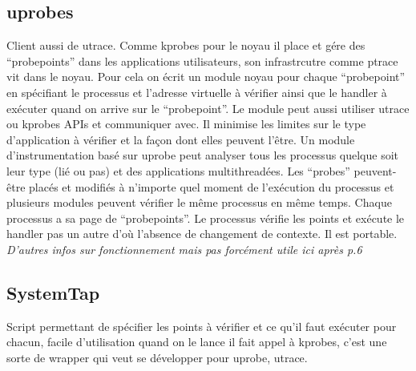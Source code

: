 \documentclass{article}
\begin{document}
\subsection{uprobes}
Client aussi de utrace. Comme kprobes pour le noyau il place et gére
des ``probepoints'' dans les applications utilisateurs, son
infrastrcutre comme ptrace vit dans le noyau. Pour cela on écrit un
module noyau pour chaque ``probepoint'' en spécifiant le processus et
l'adresse virtuelle à vérifier ainsi que le handler à exécuter quand
on arrive sur le ``probepoint''. Le module peut aussi utiliser utrace
ou kprobes APIs et communiquer avec. Il minimise les limites sur le
type d'application à vérifier et la façon dont elles peuvent
l'être. Un module d'instrumentation basé sur uprobe peut analyser tous
les processus quelque soit leur type (lié ou pas) et des applications
multithreadées. Les ``probes'' peuvent-être placés et modifiés à
n'importe quel moment de l'exécution du processus et plusieurs modules
peuvent vérifier le même processus en même temps. Chaque processus a
sa page de ``probepoints''. Le processus vérifie les points et exécute
le handler pas un autre d'où l'absence de changement de contexte. Il
est portable. \textit{D'autres infos sur fonctionnement mais pas
  forcément utile ici après p.6}

\subsection{SystemTap}
Script permettant de spécifier les points à vérifier et ce qu'il faut
exécuter pour chacun, facile d'utilisation quand on le lance il fait
appel à kprobes, c'est une sorte de wrapper qui veut se développer
pour uprobe, utrace.
\end{document}
